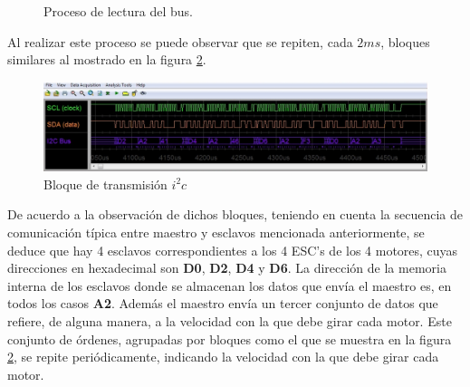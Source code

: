\documentclass[main]{subfiles}
\begin{document}
\begin{figure} [h!]
\centering
  \caption{Proceso de lectura del bus.}
  \label{fig:sniffing}
\end{figure}

Al realizar este proceso se puede observar que se repiten, cada $2ms$, bloques similares al mostrado en la figura \ref{fig:bloque_snif}.

\begin{figure}[h!]
	\centering
	\includegraphics[width=1\textwidth]{./pics_sniffer/bloque_snif.jpg}
	\caption{Bloque de transmisi\'on $i^2c$}
	\label{fig:bloque_snif}
\end{figure}

De acuerdo a la observaci\'on de dichos bloques, teniendo en cuenta la secuencia de comunicación típica entre maestro y esclavos mencionada anteriormente, se deduce que hay 4 esclavos correspondientes a los 4 ESC's de los 4 motores, cuyas direcciones en hexadecimal son \textbf{D0}, \textbf{D2}, \textbf{D4} y \textbf{D6}. La direcci\'on de la memoria interna de los esclavos donde se almacenan los datos que env\'ia el maestro es, en todos los casos \textbf{A2}. Adem\'as el maestro env\'ia un tercer conjunto de datos que refiere, de alguna manera, a la velocidad con la que debe girar cada motor.
Este conjunto de \'ordenes, agrupadas por bloques como el que se muestra en la figura \ref{fig:bloque_snif}, se repite peri\'odicamente, indicando la velocidad con la que debe girar cada motor.\\
\end{document}
